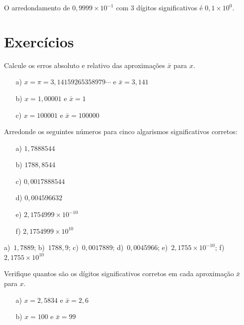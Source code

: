 \documentclass[main.tex]{subfiles}
\begin{document}
\begin{ex}
  O arredondamento de $0,9999\times 10^{-1}$ com $3$ dígitos significativos é $0,1\times 10^{0}$.
\end{ex}


\section*{Exercícios}

\begin{Exercise} Calcule os erros absoluto e relativo das aproximações $\bar{x}$ para $x$.
  \begin{itemize}
  \item[a)] $x=\pi=3,14159265358979\cdots$ e $\bar{x}=3,141$
  \item[b)] $x=1,00001$ e $\bar{x}=1$
  \item[c)] $x=100001$ e $\bar{x}=100000$
  \end{itemize}
\end{Exercise}


\begin{Exercise} Arredonde os seguintes números para cinco algarismos significativos corretos:
  \begin{multicols}{3}
    \begin{itemize}
    \item [a)] $1,7888544$
    \item [b)] $1788,8544$
    \item [c)] $0,0017888544$
    \item [d)] $0,004596632$
    \item [e)] $ 2,1754999\times 10^{-10}$
    \item [f)] $ 2,1754999\times 10^{10}$
    \end{itemize}
  \end{multicols}
\end{Exercise}
\begin{Answer}
  \begin{tiny}
a)~$1,7889$; b)~$1788,9$; c)~$0,0017889$; d)~$0,0045966$; e)~$2,1755\times 10^{-10}$; f)~$2,1755\times 10^{10}$    
  \end{tiny}
\end{Answer}

\begin{Exercise}
Verifique quantos são os dígitos significativos corretos em cada aproximação $\bar{x}$ para $x$.
\begin{itemize}
\item[a)] $x=2,5834$ e $\bar{x}=2,6$
\item[b)] $x=100$ e $\bar{x}=99$
\end{itemize}
\end{Exercise}
\end{document}
